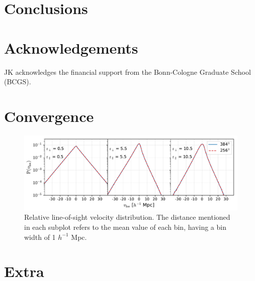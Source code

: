 \documentclass[a4paper,fleqn,usenatbib]{mnras}
\begin{document}
	\section{Conclusions}
	
	
	\section*{Acknowledgements}
	
	JK acknowledges the financial support from the Bonn-Cologne
	Graduate School (BCGS).
	
	
	
	
	
	
	
	
	
	
	\appendix
	
	\section{Convergence}
	\label{app:conv}
	\begin{figure}
		\centering
		\includegraphics[scale=0.77]{rel_los_convergence}
		\caption{Relative line-of-sight velocity distribution. The distance mentioned in each subplot refers to the mean value of each bin, having a bin width of 1 $h^{-1}$ Mpc.}
		\label{fig:conv}
	\end{figure}
	
	\section{Extra}
	\label{app:extra}




\bsp	%
\label{lastpage}
\end{document}

